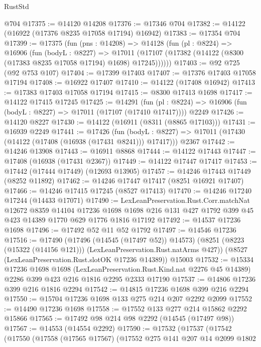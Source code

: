 \begin{lexlean}{RustStd}
\begin{coremodule}
    @704
@17375 := @14120 @14208
@17376 := @17346 @704
@17382 := @14122 (@16922 (@17376 @8235 @17058 @17194) @16942)
@17383 := @17354 @704
@17399 := @17375
    (fun (pns : @14208) =>
    @14128
      (fun (pl : @8224) =>
      @16906
        (fun (bodyL : @8227) =>
        @17011 (@17107 (@17382 (@14122 (@8300 (@17383 @8235 @17058 @17194) @1698) @17245))))))
@17403 := @92 @725 (@92 @753 @107)
@17404 := @17399 @17403
@17407 := @17376 @17403 @17058 @17194
@17408 := @16922 @17407
@17410 := @14122 (@17408 @16942)
@17413 := @17383 @17403 @17058 @17194
@17415 := @8300 @17413 @1698
@17417 := @14122 @17415 @17245
@17425 := @14291
    (fun (pl : @8224) => @16906 (fun (bodyL : @8227) => @17011 (@17107 (@17410 @17417))))
    @2249
@17426 := @14120 @8227
@17430 := @14122 (@16911 (@8311 (@8865 @17103)))
@17431 := @16939 @2249
@17441 := @17426
    (fun (bodyL : @8227) => @17011 (@17430 (@14122 (@17408 (@16938 (@17431 @8241))) @17417)))
    @2367
@17442 := @14246 @13908
@17443 := @16911 @8868
@17444 := @14122 @17443
@17447 := @17408 (@16938 (@17431 @2367))
@17449 := @14122 @17447 @17417
@17453 := @17442 (@17444 @17449) (@12693 @13905)
@17457 := @14246 @17443 @17449 (@8252 @11892)
@17462 := @14246 @17447 @17417 (@8251 @16921 @17407)
@17466 := @14246 @17415 @17245 (@8527 @17413)
@17470 := @14246 @17240 @17244 (@14433 @17071)
@17490 := LexLeanPreservation.Rust.Corr.matchNat
    @12672
    @8359
    @14104
    @17236
    @1698
    @1698
    @216
    @131
    @427
    @1792
    @399
    @45
    @423
    @14389
    @1770
    @629
    @1776
    @1816
    @17192
@17492 := @14537 @17236 @1698
@17496 := @17492 @52 @11 @52 @1792
@17497 := @14546 @17236
@17516 := @17490
    (@17496 (@14545 (@17497 @52)) @14573)
    (@8251 (@8223 (@15322 (@14156 @121))) (LexLeanPreservation.Rust.natArms @427))
    (@8527 (LexLeanPreservation.Rust.slotOK @17236 @14389))
    @15003
@17532 := @15334
    @17236
    @1698
    @1698
    (LexLeanPreservation.Rust.Kind.nat @2276 @45 @14389)
    @2286
    @399
    @423
    @216
    @1816
    @2295
    @2333
    @17190
@17537 := @14806 @17236 @399 @216 @1816 @2294
@17542 := @14815 @17236 @1698 @399 @216 @2294
@17550 := @15704 @17236 @1698 @133 @275 @214 @207 @2292 @2099
@17552 := @14490 @17236 @1698
@17558 := @17552 @133 @277 @214 @15862 @2292 @15866
@17565 := @17492 @98 @214 @98 @2292 (@14545 (@17497 @98))
@17567 := @14553 (@14554 @2292)
@17590 := @17532
    (@17537
      (@17542
        (@17550
          (@17558
            (@17565 @17567)
            (@17552
              @275
              @141
              @207
              @14
              @2099
              @1802

\end{coremodule}
\end{lexlean}
